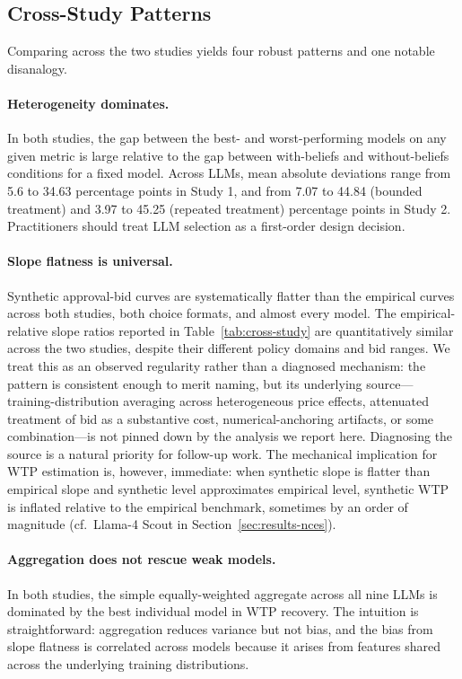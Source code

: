\documentclass[12pt]{article}
\begin{document}
\subsection{Cross-Study Patterns}\label{sec:results-cross}

Comparing across the two studies yields four robust patterns and one
notable disanalogy.

\paragraph{Heterogeneity dominates.} In both studies, the gap between the
best- and worst-performing models on any given metric is large relative
to the gap between with-beliefs and without-beliefs conditions for a
fixed model. Across LLMs, mean absolute deviations range from 5.6 to 34.63 percentage points in Study 1, and from 7.07 to 44.84 (bounded treatment) and 3.97 to 45.25 (repeated treatment) percentage points in Study 2. Practitioners should treat LLM selection as a first-order design
decision.

\paragraph{Slope flatness is universal.} Synthetic approval-bid curves
are systematically flatter than the empirical curves across both studies,
both choice formats, and almost every model. The empirical-relative slope
ratios reported in Table~\ref{tab:cross-study} are quantitatively similar
across the two studies, despite their different policy domains and bid
ranges. We treat this as an observed regularity rather than a diagnosed
mechanism: the pattern is consistent enough to merit naming, but its
underlying source---training-distribution averaging across heterogeneous
price effects, attenuated treatment of bid as a substantive cost,
numerical-anchoring artifacts, or some combination---is not pinned down
by the analysis we report here. Diagnosing the source is a natural
priority for follow-up work. The mechanical implication for WTP estimation
is, however, immediate: when synthetic slope is flatter than empirical
slope and synthetic level approximates empirical level, synthetic WTP is
inflated relative to the empirical benchmark, sometimes by an order of
magnitude (cf.~Llama-4 Scout in Section~\ref{sec:results-nces}).

\paragraph{Aggregation does not rescue weak models.} In both studies, the
simple equally-weighted aggregate across all nine LLMs is dominated by the
best individual model in WTP recovery. The intuition is straightforward:
aggregation reduces variance but not bias, and the bias from slope
flatness is correlated across models because it arises from features
shared across the underlying training distributions.
\end{document}
